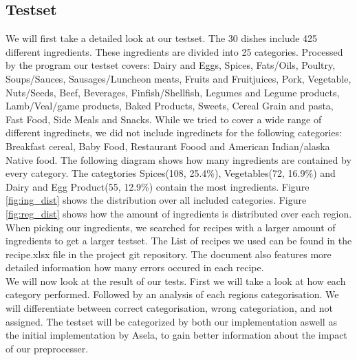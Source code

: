 \subsection{Testset}\label{sub_testset}
We will first take a detailed look at our testset. The 30 dishes include 425 different ingredients. These ingredients are divided into 25 categories. Processed by the program our testset covers: Dairy and Eggs, Spices, Fats/Oils, Poultry, Soups/Sauces, Sausages/Luncheon meats, Fruits and Fruitjuices, Pork, Vegetable, Nuts/Seeds, Beef, Beverages, Finfish/Shellfish, Legumes and Legume products, Lamb/Veal/game products, Baked Products, Sweets, Cereal Grain and pasta, Fast Food, Side Meals and Snacks. While we tried to cover a wide range of different ingredinets, we did not include ingredinets for the following categories: Breakfast cereal, Baby Food, Restaurant Foood and American Indian/alaska Native food. 
The following diagram shows how many ingredients are contained by every category. The categtories Spices(108, 25.4\%), Vegetables(72, 16.9\%) and Dairy and Egg Product(55, 12.9\%) contain the most ingredients. Figure \ref{fig:ing_dist} shows the distribution over all included categories. Figure \ref{fig:reg_dist} shows how the amount of ingredients is distributed over each region. When picking our ingredients, we searched for recipes with a larger amount of ingredients to get a larger testset. The List of recipes we used can be found in the recipe.xlsx file in the project git repository. The document also features more detailed information how many errors occured in each recipe.\\
We will now look at the result of our tests. First we will take a look at how each category performed. Followed by an analysis of each regions categorisation.
We will differentiate between correct categorisation, wrong categoriation, and not assigned. The testset will be categorized by both our implementation aswell as the initial implementation by Asela, to gain better information about the impact of our preprocesser.
 
